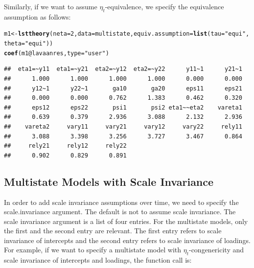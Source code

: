 \documentclass[10pt]{article}\usepackage{graphicx, color}
\makeatletter
\newcommand{\hlfunctioncall}[1]{\textcolor[rgb]{0.501960784313725,0,0.329411764705882}{\textbf{#1}}}%
\newcommand{\hlstring}[1]{\textcolor[rgb]{0.6,0.6,1}{#1}}%
\newenvironment{kframe}{%
 \def\at@end@of@kframe{}%
 \ifinner\ifhmode%
  \def\at@end@of@kframe{\end{minipage}}%
  \begin{minipage}{\columnwidth}%
 \fi\fi%
 \def\FrameCommand##1{\hskip\@totalleftmargin \hskip-\fboxsep
 \colorbox{shadecolor}{##1}\hskip-\fboxsep
     \hskip-\linewidth \hskip-\@totalleftmargin \hskip\columnwidth}%
 \MakeFramed {\advance\hsize-\width
   \@totalleftmargin\z@ \linewidth\hsize
   \@setminipage}}%
 {\par\unskip\endMakeFramed%
 \at@end@of@kframe}
\newenvironment{knitrout}{}{} %
\makeatother
\begin{document}
Similarly, if we want to assume $\eta_t$-equivalence, we specify the equivalence assumption as follows:
%
\begin{knitrout}
\color{fgcolor}\begin{kframe}
\begin{alltt}
m1 <- \hlfunctioncall{lsttheory}(neta = 2, data = multistate, equiv.assumption = \hlfunctioncall{list}(tau = \hlstring{"equi"}, 
    theta = \hlstring{"equi"}))
\hlfunctioncall{coef}(m1@lavaanres, type = \hlstring{"user"})
\end{alltt}
\begin{verbatim}
##  eta1=~y11  eta1=~y21  eta2=~y12  eta2=~y22      y11~1      y21~1 
##      1.000      1.000      1.000      1.000      0.000      0.000 
##      y12~1      y22~1       ga10       ga20      eps11      eps21 
##      0.000      0.000      0.762      1.383      0.462      0.320 
##      eps12      eps22       psi1       psi2 eta1~~eta2    vareta1 
##      0.639      0.379      2.936      3.088      2.132      2.936 
##    vareta2     vary11     vary21     vary12     vary22     rely11 
##      3.088      3.398      3.256      3.727      3.467      0.864 
##     rely21     rely12     rely22 
##      0.902      0.829      0.891
\end{verbatim}
\end{kframe}
\end{knitrout}

%



\subsection{Multistate Models with Scale Invariance}

In order to add scale invariance assumptions over time, we need to specify the scale.invariance argument. The default is not to assume scale invariance. The scale invariance argument is a list of four entries. For the multistate models, only the first and the second entry are relevant. The first entry refers to scale invariance of intercepts and the second entry refers to scale invariance of loadings. For example, if we want to specify a multistate model with $\eta_t$-congenericity and scale invariance of intercepts and loadings, the function call is:
\end{document}
